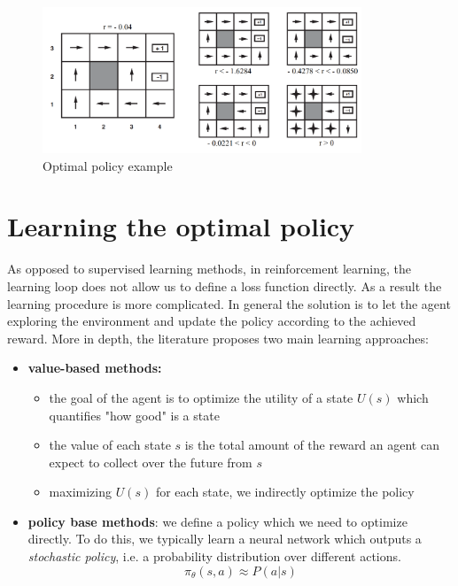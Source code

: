 \begin{figure}[H]
	\centering
	\includegraphics[width=0.85\textwidth]{
		images/19_ReinforcementLearning_optimalPolicy.png
	}
	\caption{Optimal policy example}
	\label{fig:optimalPolicy}
\end{figure}

\section{Learning the optimal policy}
As opposed to supervised learning methods, in reinforcement learning, the learning
loop does not allow us to define a loss function directly. As a result the
learning procedure is more complicated. In general the solution is to let the agent
exploring the environment and update the policy according to the achieved reward.
More in depth, the literature proposes two main learning approaches:
\begin{itemize}
	\item \textbf{value-based methods:}
		\begin{itemize}
			\item the goal of the agent is to optimize the utility of a state $U(s)$ which
				quantifies "how good" is a state

			\item the value of each state $s$ is the total amount of the reward an agent
				can expect to collect over the future from $s$

			\item maximizing $U(s)$ for each state, we indirectly optimize the policy
		\end{itemize}

	\item \textbf{policy base methods}: we define a policy which we need to optimize
		directly. To do this, we typically learn a neural network which outputs a \textit{stochastic
		policy}, i.e. a probability distribution over different actions.
		\[
			\pi_{\theta} (s,a) \approx P(a|s)
		\]
\end{itemize}

